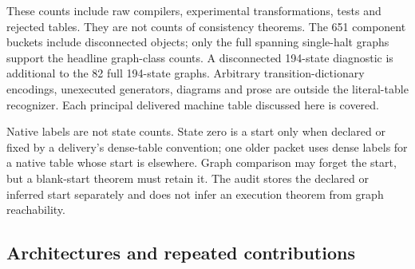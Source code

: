 These counts include raw compilers, experimental transformations, tests and
rejected tables. They are not counts of consistency theorems. The 651
component buckets include disconnected objects; only the full spanning
single-halt graphs support the headline graph-class counts. A disconnected
194-state diagnostic is additional to the 82 full 194-state graphs.
Arbitrary transition-dictionary encodings, unexecuted generators, diagrams
and prose are outside the literal-table recognizer. Each principal delivered
machine table discussed here is covered.

Native labels are not state counts. State zero is a start only when declared
or fixed by a delivery's dense-table convention; one older packet uses dense
labels for a native table whose start is elsewhere. Graph comparison may
forget the start, but a blank-start theorem must retain it. The audit stores
the declared or inferred start separately and does not infer an execution
theorem from graph reachability.

\subsection{Architectures and repeated contributions}

